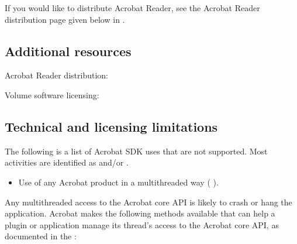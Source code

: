 \documentclass[letterpaper,12pt,english,openany,oneside]{sphinxmanual}
\begin{document}
If you would like to distribute Acrobat Reader, see the Acrobat Reader distribution page given below in .




\subsection{Additional resources}
\label{\detokenize{index:additional-resources}}
Acrobat Reader distribution: 

Volume software licensing: 




\subsection{Technical and licensing limitations}
\label{\detokenize{index:technical-and-licensing-limitations}}
The following is a list of Acrobat SDK uses that are not supported. Most activities are identified as  and/or  .
\begin{itemize}
\item {} 
Use of any Acrobat product in a multithreaded way (  ).

\end{itemize}

Any multithreaded access to the Acrobat core API is likely to crash or hang the application. Acrobat makes the following methods available that can help a plug\sphinxhyphen{}in or application manage its thread’s access to the Acrobat core API, as documented in the  :

\begin{sphinxVerbatim}[commandchars=\\\{\}]
\end{sphinxVerbatim}
\end{document}
